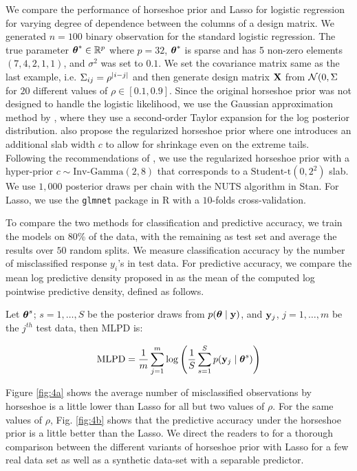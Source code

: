\documentclass[sts,preprint]{imsart}
\begin{document}
We compare the performance of horseshoe prior and Lasso for logistic regression for varying degree of dependence between the columns of a design matrix. We generated $n = 100$ binary observation for the standard logistic regression. The true parameter $\boldsymbol{\theta}^* \in \mathbb{R}^p$ where $p = 32$, $\boldsymbol{\theta}^*$ is sparse and has 5 non-zero elements $(7, 4, 2, 1, 1)$, and $\sigma^2$ was set to $0.1$. We set the covariance matrix same as the last example, i.e. $\Sigma_{ij} = \rho^{\lvert i-j\rvert}$ and then generate design matrix ${\bf X}$ from ${\cal N}(0, \Sigma$ for $20$ different values of $\rho \in [0.1, 0.9]$. Since the original horseshoe prior was not designed to handle the logistic likelihood, we use the Gaussian approximation method by \cite{piironen2017sparsity}, where they use a second-order Taylor expansion for the log posterior distribution. \cite{piironen2017sparsity} also propose the regularized horseshoe prior where one introduces an additional slab width $c$ to allow for shrinkage even on the extreme tails. Following the recommendations of \cite{piironen2017sparsity}, we use the regularized horseshoe prior with a hyper-prior $c \sim \text{Inv-Gamma}(2,8)$ that corresponds to a $\text{Student-t}(0, 2^2)$ slab. We use $1,000$ posterior draws per chain with the NUTS algorithm in Stan. For Lasso, we use the \texttt{glmnet} package in R with a $10$-folds cross-validation. 

To compare the two methods for classification and predictive accuracy, we train the models on 80\% of the data, with the remaining as test set and average the results over $50$ random splits. We measure classification accuracy by the number of misclassified response $y_i$'s in test data. For predictive accuracy, we compare the mean log predictive density proposed in \cite{gelman2014understanding} as the mean of the computed log pointwise predictive density, defined as follows. 

Let $\boldsymbol{\theta}^s$; $s = 1, \ldots, S$ be the posterior draws from $p(\boldsymbol{\theta} \mid {\bf y})$, and ${\bf y}_j$, $j = 1, \ldots, m$ be the $j^{th}$ test data, then MLPD is:

\begin{equation}
\text{MLPD} = \frac{1}{m} \sum_{j=1}^{m} \log \left( \frac{1}{S} \sum_{s=1}^{S} p({\bf y}_j \mid \boldsymbol{\theta}^s) \right)
\label{eq:mlpd}
\end{equation}

Figure \ref{fig:4a} shows the average number of misclassified observations by horseshoe is a little lower than Lasso for all but two values of $\rho$. For the same values of $\rho$, Fig. \ref{fig:4b} shows that the predictive accuracy under the horseshoe prior is a little better than the Lasso. We direct the readers to \cite{piironen2017sparsity} for a thorough comparison between the different variants of horseshoe prior with Lasso for a few real data set as well as a synthetic data-set with a separable predictor.
\end{document}
